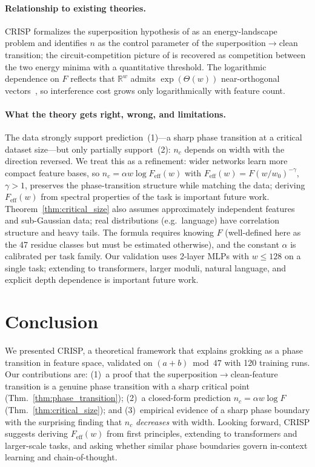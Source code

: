 \documentclass{article}
\newcommand{\nc}{n_c}
\newcommand{\reals}{\mathbb{R}}
\newcommand{\Fnum}{F}
\begin{document}
\paragraph{Relationship to existing theories.}
CRISP formalizes the superposition hypothesis of \citet{elhage2022toy} as an energy-landscape problem and identifies $n$ as the control parameter of the superposition$\to$clean transition; the circuit-competition picture of \citet{nanda2023progress} is recovered as competition between the two energy minima with a quantitative threshold. The logarithmic dependence on $\Fnum$ reflects that $\reals^w$ admits $\exp(\Theta(w))$ near-orthogonal vectors~\citep{milman1986asymptotic}, so interference cost grows only logarithmically with feature count.

\paragraph{What the theory gets right, wrong, and limitations.}
The data strongly support prediction~(1)---a sharp phase transition at a critical dataset size---but only partially support~(2): $\nc$ depends on width with the direction reversed. We treat this as a refinement: wider networks learn more compact feature bases, so $\nc = \alpha w \log F_{\text{eff}}(w)$ with $F_{\text{eff}}(w) = \Fnum (w/w_0)^{-\gamma}$, $\gamma > 1$, preserves the phase-transition structure while matching the data; deriving $F_{\text{eff}}(w)$ from spectral properties of the task is important future work.
Theorem~\ref{thm:critical_size} also assumes approximately independent features and sub-Gaussian data; real distributions (e.g.\ language) have correlation structure and heavy tails. The formula requires knowing $\Fnum$ (well-defined here as the 47 residue classes but must be estimated otherwise), and the constant $\alpha$ is calibrated per task family. Our validation uses 2-layer MLPs with $w \leq 128$ on a single task; extending to transformers, larger moduli, natural language, and explicit depth dependence \citep{saxe2014exact} is important future work.


\section{Conclusion}
\label{sec:conclusion}

We presented CRISP, a theoretical framework that explains grokking as a phase transition in feature space, validated on $(a+b)\bmod 47$ with 120 training runs. Our contributions are: (1)~a proof that the superposition$\to$clean-feature transition is a genuine phase transition with a sharp critical point (Thm.~\ref{thm:phase_transition}); (2)~a closed-form prediction $\nc = \alpha w \log \Fnum$ (Thm.~\ref{thm:critical_size}); and (3)~empirical evidence of a sharp phase boundary with the surprising finding that $\nc$ \emph{decreases} with width.
Looking forward, CRISP suggests deriving $F_{\text{eff}}(w)$ from first principles, extending to transformers and larger-scale tasks, and asking whether similar phase boundaries govern in-context learning and chain-of-thought.
\end{document}
